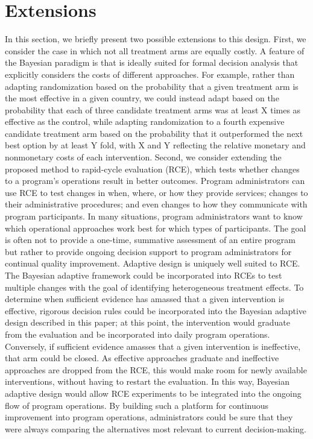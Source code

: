 \documentclass{acm_proc_article-sp}
\begin{document}
\section{Extensions}
In this section, we briefly present two possible extensions to this design. First, we consider the case in which not all treatment arms are equally costly. A feature of the Bayesian paradigm is that is ideally suited for formal decision analysis that explicitly considers the costs of different approaches. For example, rather than adapting randomization based on the probability that a given treatment arm is the most effective in a given country, we could instead adapt based on the probability that each of three candidate treatment arms was at least X times as effective as the control, while adapting randomization to a fourth expensive candidate treatment arm based on the probability that it outperformed the next best option by at least Y fold, with X and Y reflecting the relative monetary and nonmonetary costs of each intervention.
Second, we consider extending the proposed method to rapid-cycle evaluation (RCE), which tests whether changes to a program's operations result in better outcomes. Program administrators can use RCE to test changes in when, where, or how they provide services; changes to their administrative procedures; and even changes to how they communicate with program participants. In many situations, program administrators want to know which operational approaches work best for which types of participants. The goal is often not to provide a one-time, summative assessment of an entire program but rather to provide ongoing decision support to program administrators for continual quality improvement.
Adaptive design is uniquely well suited to RCE. The Bayesian adaptive framework could be incorporated into RCEs to test multiple changes with the goal of identifying heterogeneous treatment effects. To determine when sufficient evidence has amassed that a given intervention is effective, rigorous decision rules could be incorporated into the Bayesian adaptive design described in this paper; at this point, the intervention would graduate from the evaluation and be incorporated into daily program operations. Conversely, if sufficient evidence amasses that a given intervention is ineffective, that arm could be closed. As effective approaches graduate and ineffective approaches are dropped from the RCE, this would make room for newly available interventions, without having to restart the evaluation. In this way, Bayesian adaptive design would allow RCE experiments to be integrated into the ongoing flow of program operations. By building such a platform for continuous improvement into program operations, administrators could be sure that they were always comparing the alternatives most relevant to current decision-making.
\end{document}
